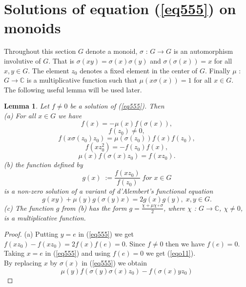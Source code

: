 \documentclass[12pt]{amsart}
\newtheorem{lem}[thm]{Lemma}
\theoremstyle{definition}
\theoremstyle{remark}
\numberwithin{equation}{section}
\begin{document}
\section{Solutions of equation (\ref{eq555}) on monoids}
Throughout this section $G$ denote a monoid, $\sigma$ :
$G\longrightarrow G$ is an automorphism involutive of $G$. That is
$\sigma(xy)=\sigma(x)\sigma(y)$ and $\sigma(\sigma(x))=x$ for all
$x,y\in G$. The element $z_0$ denotes a fixed element in the center
of $G$. Finally $\mu$ : $G\longrightarrow \mathbb{C}$ is a
multiplicative function such that $\mu(x\sigma(x))=1$ for all $x\in
G$.\\The following useful lemma will be used later.
\begin{lem} Let $f \neq 0$ be a solution of (\ref{eq555}). Then \\ (a) For
all $x\in G$ we have
\begin{equation}\label{eqo7}
    f(x)=-\mu(x)f(\sigma(x)),
\end{equation}
\begin{equation}\label{eqo8}
    f(z_0)\neq 0,
\end{equation}
\begin{equation}\label{eqo9}
    f(x\sigma(z_0)z_0)=\mu(\sigma(z_0))f(x)f(z_0),
\end{equation}
\begin{equation}\label{eqo10}
    f(xz_{0}^{2})=-f(z_0)f(x),
\end{equation}
\begin{equation}\label{eqo11}
    \mu(x)f(\sigma(x)z_0)=f(xz_0).
\end{equation} (b) the function defined by $$g(x)\;:=\frac{f(xz_0)}{f(z_0)}\;for
\;x\in G$$ is a non-zero  solution of a variant of d'Alembert's
functional equation
\begin{equation}\label{EQUATIONES}
    g(xy)+\mu(y)g(\sigma(y)x)=2g(x)g(y),\;x,y\in G.
\end{equation}
(c) The function $g$ from (b) has the form
$g=\frac{\chi+\mu\chi\circ \sigma}{2}$, where $\chi$ :
$G\longrightarrow \mathbb{C}$, $\chi\neq 0$, is a multiplicative
function.
 \end{lem}\begin{proof} (a) Putting $y=e$ in (\ref{eq555}) we get $f(xz_0)-f(xz_0)=2f(x)f(e)=0$. Since $f\neq0$ then we have $f(e)=0$.\\
 Taking $x=e$ in (\ref{eq555}) and using $f(e)=0$ we get
 (\ref{eqo11}). \\By replacing $x$ by $\sigma(x)$ in (\ref{eq555}) we
 obtain $$\mu(y)f(\sigma(y)\sigma(x)z_0)-f(\sigma(x)yz_0)
$$
\end{proof}
\end{document}
